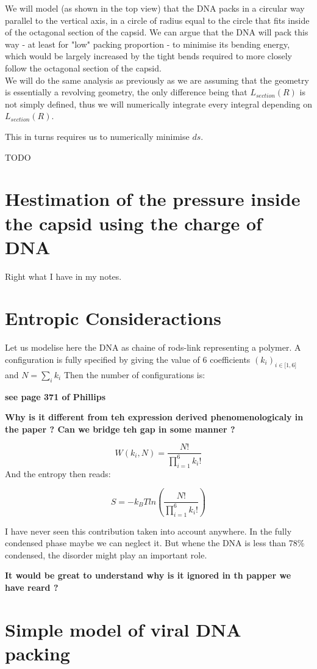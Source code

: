 \documentclass{article}
\begin{document}
We will model (as shown in the top view) that the DNA packs in a circular way parallel to the vertical axis, in a circle of radius equal to the circle that fits inside of the octagonal section of the capsid. We can argue that the DNA will pack this way - at least for "low" packing proportion - to minimise its bending energy, which would be largely increased by the tight bends required to more closely follow the octagonal section of the capsid. \\

We will do the same analysis as previously as we are assuming that the geometry is essentially a revolving geometry, the only difference being that $L_{section}(R)$ is not simply defined, thus we will numerically integrate every integral depending on $L_{section}(R)$.

This in turns requires us to numerically minimise $ds$.

TODO

\section{Hestimation of the pressure inside the capsid using the charge of DNA}

Right what I have in my notes.

\section{Entropic Consideractions}
Let us modelise here the DNA as chaine of rods-link representing a polymer. A configuration is fully specified by giving the value of 6 coefficients $(k_i)_{i\in \mathbf{[} 1, 6 \mathbf{]}} $ and $N=\sum_i k_i$
Then the number of configurations is:

\textbf{see page 371 of Phillips}

\textbf{Why is it different from teh expression derived phenomenologicaly in the paper ? Can we bridge teh gap in some manner ?}

\begin{equation}
    W({k_i},N) = \frac{N!}{\prod_{i=1}^6 k_i!}
\end{equation}
And the entropy then reads:

\begin{equation}
     S = - k_B T ln \left( \frac{N!}{\prod_{i=1}^6 k_i!} \right)
\end{equation}

I have never seen this contribution taken into account anywhere. In the fully condensed phase maybe we can neglect it. But whene the DNA is less than 78\% condensed, the disorder might play an important role.

\textbf{It would be great to understand why is it ignored in th papper we have reard ?}

\section{Simple model of viral DNA packing}


\printbibliography[
    heading=bibintoc,
    title={References} ]
\end{document}
